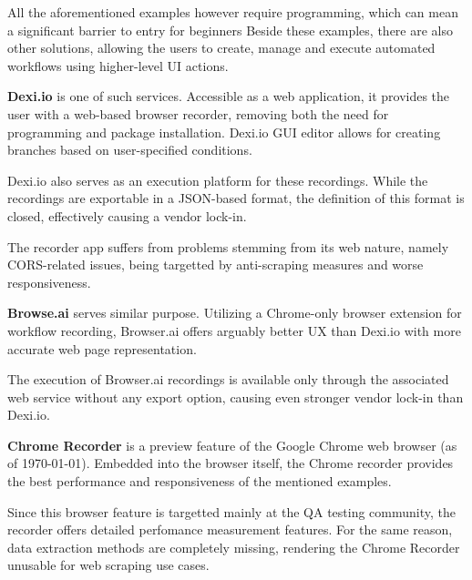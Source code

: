 \emptyline

All the aforementioned examples however require programming, which can mean a significant barrier to entry for beginners
Beside these examples, there are also other solutions, allowing the users to create, manage and execute automated workflows using higher-level UI actions.

\emptyline

\textbf{Dexi.io} is one of such services. 
Accessible as a web application, it provides the user with a web-based browser recorder, removing both the need for programming and package installation.
Dexi.io \ac{GUI} editor allows for creating branches based on user-specified conditions.

Dexi.io also serves as an execution platform for these recordings. 
While the recordings are exportable in a JSON-based format, the definition of this format is closed, effectively causing a vendor lock-in.

The recorder app suffers from problems stemming from its web nature, namely \acs{CORS}-related issues, being targetted by anti-scraping measures and worse responsiveness.

\textbf{Browse.ai} serves similar purpose. 
Utilizing a Chrome-only browser extension for workflow recording, Browser.ai offers arguably better \ac{UX} than Dexi.io with more accurate web page representation.

The execution of Browser.ai recordings is available only through the associated web service without any export option, causing even stronger vendor lock-in than Dexi.io.

\textbf{Chrome Recorder} is a preview feature of the Google Chrome web browser (as of \today).
Embedded into the browser itself, the Chrome recorder provides the best performance and responsiveness of the mentioned examples. 

Since this browser feature is targetted mainly at the \ac{QA} testing community, the recorder offers detailed perfomance measurement features.
For the same reason, data extraction methods are completely missing, rendering the Chrome Recorder unusable for web scraping use cases.